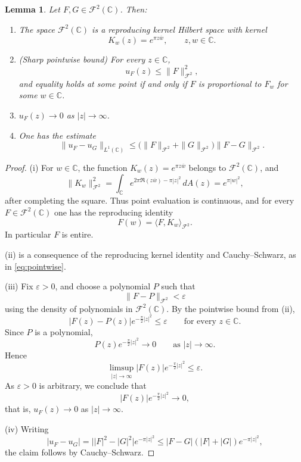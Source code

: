 \documentclass[a4paper,11pt,reqno]{amsart}
\numberwithin{equation}{section}
\theoremstyle{plain} %
\newtheorem{lemma}{Lemma}[section]
\theoremstyle{definition} %
\theoremstyle{remark}
\newcommand{\C}{\mathbb{C}}
\begin{document}
\begin{lemma}\label{lem:Fock-basic}
Let $F,G \in \mathcal{F}^2(\mathbb{C})$. Then:
\begin{enumerate}
\item[(i)] The space $\mathcal{F}^2(\mathbb{C})$ is a reproducing kernel Hilbert space with kernel
\[
K_w(z) = e^{\pi z \overline{w}}, \qquad z,w \in \mathbb{C}.
\]

\item[(ii)] (Sharp pointwise bound) For every $z \in \mathbb{C}$,
\[
u_F(z) \le \|F\|_{\mathcal{F}^2}^2,
\]
and equality holds at some point if and only if $F$ is proportional to $F_w$
for some $w \in \mathbb{C}$.

\item[(iii)] $u_F(z) \to 0$ as $|z| \to \infty$.

\item[(iv)] One has the estimate
\[
\|u_F - u_G\|_{L^1(\mathbb{C})}
\le \big( \|F\|_{\mathcal{F}^2} + \|G\|_{\mathcal{F}^2} \big)
\|F - G\|_{\mathcal{F}^2}.
\]
\end{enumerate}
\end{lemma}

\begin{proof}
(i) For \(w\in \C\), the function \(K_w(z)=e^{\pi z\overline w}\) belongs to
\(\mathcal F^2(\C)\), and
\[
\|K_w\|_{\mathcal F^2}^2
=
\int_{\C} e^{2\pi \Re(z\overline w)-\pi |z|^2}\,dA(z)
=
e^{\pi |w|^2},
\]
after completing the square. Thus point evaluation is continuous, and for every
\(F\in \mathcal F^2(\C)\) one has the reproducing identity
\[
F(w)=\langle F,K_w\rangle_{\mathcal F^2}.
\]
In particular \(F\) is entire.

(ii) is a consequence of the reproducing kernel identity and Cauchy--Schwarz,
as in \eqref{eq:pointwise}.

(iii) Fix \(\varepsilon>0\), and choose a polynomial \(P\) such that
\[
\|F-P\|_{\mathcal F^2}<\varepsilon
\]
using the density of polynomials in \(\mathcal F^2(\C)\). By the pointwise bound from (ii),
\[
|F(z)-P(z)|e^{-\frac{\pi}{2}|z|^2}\le \varepsilon
\qquad\text{for every }z\in \C.
\]
Since \(P\) is a polynomial,
\[
P(z)e^{-\frac{\pi}{2}|z|^2}\to 0
\qquad\text{as }|z|\to\infty.
\]
Hence
\[
\limsup_{|z|\to\infty}|F(z)|e^{-\frac{\pi}{2}|z|^2}\le \varepsilon.
\]
As \(\varepsilon>0\) is arbitrary, we conclude that
\[
|F(z)|e^{-\frac{\pi}{2}|z|^2}\to 0,
\]
that is, \(u_F(z)\to 0\) as \(|z|\to\infty\).

(iv) Writing
\[
|u_F - u_G|
= \big||F|^2 - |G|^2\big| e^{-\pi|z|^2}
\le |F-G|(|F|+|G|) e^{-\pi|z|^2},
\]
the claim follows by Cauchy--Schwarz.
\end{proof}
\end{document}

